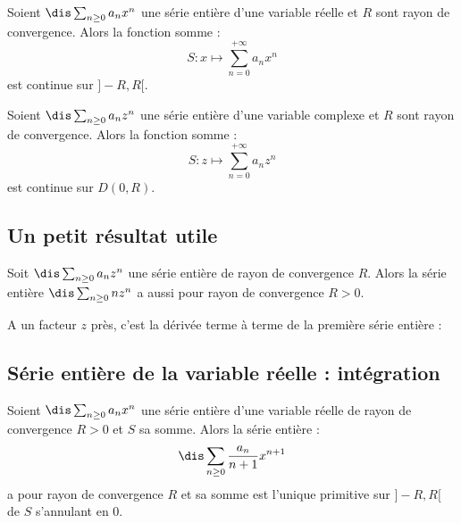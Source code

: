 \documentclass[a4paper,10pt]{report}
\begin{document}
\begin{thm} Soient $\dis \sum_{n \geq 0} a_n x^n$ une série entière d'une variable réelle et $R$ sont rayon de convergence. Alors la fonction somme :
$$ S : x \mapsto \sum_{n=0}^{+ \infty} a_n x^n $$
est continue sur $]-R,R[$.
\end{thm}

\begin{preuve}
\vspace{4cm}
\end{preuve}

\begin{thm} Soient $\dis \sum_{n \geq 0} a_n z^n$ une série entière d'une variable complexe et $R$ sont rayon de convergence. Alors la fonction somme :
$$ S : z \mapsto \sum_{n=0}^{+ \infty} a_n z^n $$
est continue sur $D(0,R)$.
\end{thm}

\subsection{Un petit résultat utile}

\begin{prop} Soit $\dis \sum_{n \geq 0} a_n z^n$ une série entière de rayon de convergence $R$. Alors la série entière $\dis \sum_{n \geq 0} n z^n$ a aussi pour rayon de convergence $R>0$.
\end{prop}

\begin{rem} A un facteur $z$ près, c'est la \og dérivée terme à terme \fg de la première série entière :

\vspace{3cm}
\end{rem}

\begin{preuve}
\vspace{7.5cm}
\end{preuve} 



\subsection{Série entière de la variable réelle : intégration}

\begin{thm}
Soient $\dis \sum_{n \geq 0} a_n x^n$ une série entière d'une variable réelle de rayon de convergence $R>0$ et $S$ sa somme. Alors la série entière :
$$ \dis \sum_{n \geq 0}  \dfrac{a_n}{n+1} x^{n+1}$$
a pour rayon de convergence $R$ et sa somme est l'unique primitive sur $]-R,R[$ de $S$ s'annulant en $0$.
\end{thm}
\end{document}
